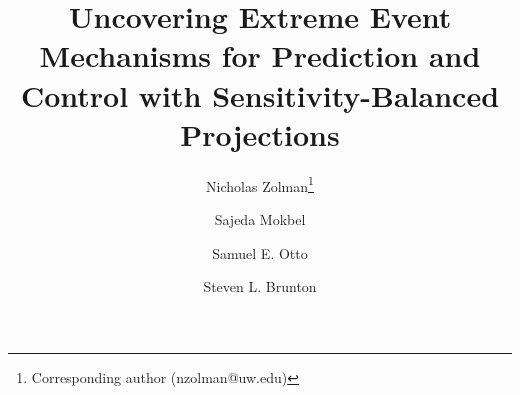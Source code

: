\documentclass[twocolumn,10pt]{article}
\title{\huge{\textbf{Uncovering Extreme Event Mechanisms for Prediction and Control with Sensitivity-Balanced Projections
}}}
\author[1,2]{Nicholas Zolman\thanks{Corresponding author (nzolman@uw.edu)}}
\author[1,2]{Sajeda Mokbel}
\author[3]{Samuel E. Otto}
\author[1,2]{Steven L. Brunton}
{\small
\affil[1]{\small Department of Mechanical Engineering, University of Washington, Seattle, WA 98195, USA}
\affil[2]{\small AI Institute in Dynamic Systems, University of Washington, Seattle, WA 98195, USA}
\affil[3]{\small Sibley School of Mechanical and Aerospace Engineering, Cornell University, Ithaca, NY, USA}

}
\date{}
\begin{document}
\newcommand{\cobrasPsi}[0]{\mathbf \Psi}
\newcommand{\cobrasPhi}[0]{\mathbf \Phi}
\newcommand{\cobrasOutput}[0]{\mathbf Q}
\newcommand{\controlInput}[0]{\mathbf u}

\newcommand{\energyDissipation}[0]{\varepsilon}
\newcommand{\navierStokesOp}[0]{\mathcal{NS}}
\newcommand{\kFlowVel}[0]{\mathbf v}
\newcommand{\kFlowVort}[0]{\boldsymbol{\omega}}

\newcommand{\mnls}[0]{A}
\newcommand{\mnlsPotentialGradient}[0]{\mathcal G}
\newcommand{\mnlsGauss}[0]{\rho}
\newcommand{\mnlsSpatial}[0]{\eta}



\end{document}
